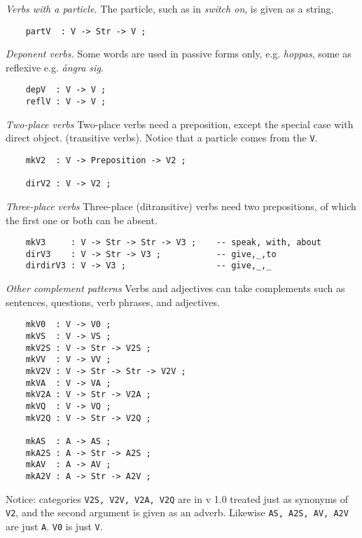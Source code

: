 \documentclass[11pt,a4paper]{article}
\newcommand{\subsubsubsection}[1]{\textit{#1}}
\begin{document}
\subsubsubsection{Verbs with a particle.}
The particle, such as in \textit{switch on}, is given as a string.

\begin{verbatim}
    partV  : V -> Str -> V ;
\end{verbatim}

\subsubsubsection{Deponent verbs.}
Some words are used in passive forms only, e.g. \textit{hoppas}, some as
reflexive e.g. \textit{ångra sig}.

\begin{verbatim}
    depV  : V -> V ;
    reflV : V -> V ;
\end{verbatim}

\subsubsubsection{Two-place verbs}
Two-place verbs need a preposition, except the special case with direct object.
(transitive verbs). Notice that a particle comes from the \texttt{V}.

\begin{verbatim}
    mkV2  : V -> Preposition -> V2 ;
  
    dirV2 : V -> V2 ;
\end{verbatim}

\subsubsubsection{Three-place verbs}
Three-place (ditransitive) verbs need two prepositions, of which
the first one or both can be absent.

\begin{verbatim}
    mkV3     : V -> Str -> Str -> V3 ;    -- speak, with, about
    dirV3    : V -> Str -> V3 ;           -- give,_,to
    dirdirV3 : V -> V3 ;                  -- give,_,_
\end{verbatim}

\subsubsubsection{Other complement patterns}
Verbs and adjectives can take complements such as sentences,
questions, verb phrases, and adjectives.

\begin{verbatim}
    mkV0  : V -> V0 ;
    mkVS  : V -> VS ;
    mkV2S : V -> Str -> V2S ;
    mkVV  : V -> VV ;
    mkV2V : V -> Str -> Str -> V2V ;
    mkVA  : V -> VA ;
    mkV2A : V -> Str -> V2A ;
    mkVQ  : V -> VQ ;
    mkV2Q : V -> Str -> V2Q ;
  
    mkAS  : A -> AS ;
    mkA2S : A -> Str -> A2S ;
    mkAV  : A -> AV ;
    mkA2V : A -> Str -> A2V ;
\end{verbatim}

Notice: categories \texttt{V2S, V2V, V2A, V2Q} are in v 1.0 treated
just as synonyms of \texttt{V2}, and the second argument is given
as an adverb. Likewise \texttt{AS, A2S, AV, A2V} are just \texttt{A}.
\texttt{V0} is just \texttt{V}.
\end{document}
